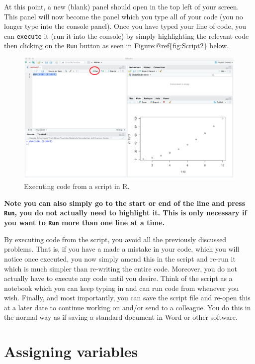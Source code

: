 \documentclass[
]{book}
\theoremstyle{definition}
\theoremstyle{definition}
\theoremstyle{definition}
\theoremstyle{definition}
\theoremstyle{remark}
\begin{document}
At this point, a new (blank) panel should open in the top left of your screen. This panel will now become the panel which you type all of your code (you no longer type into the console panel). Once you have typed your line of code, you can \texttt{execute} it (run it into the console) by simply highlighting the relevant code then clicking on the \texttt{Run} button as seen in Figure:@ref\{fig:Script2\} below.

\begin{figure}

{\centering \includegraphics[width=0.7\linewidth]{Figures/Script2} 

}

\caption{Executing code from a script in R.}\label{fig:Script2}
\end{figure}

\textbf{Note you can also simply go to the start or end of the line and press \texttt{Run}, you do not actually need to highlight it. This is only necessary if you want to \texttt{Run} more than one line at a time.}

By executing code from the script, you avoid all the previously discussed problems. That is, if you have a made a mistake in your code, which you will notice once executed, you now simply amend this in the script and re-run it which is much simpler than re-writing the entire code. Moreover, you do not actually have to execute any code until you desire. Think of the script as a notebook which you can keep typing in and can run code from whenever you wish. Finally, and most importantly, you can save the script file and re-open this at a later date to continue working on and/or send to a colleague. You do this in the normal way as if saving a standard document in Word or other software.

\hypertarget{assigning-variables}{%
\section{Assigning variables}\label{assigning-variables}}
\end{document}

